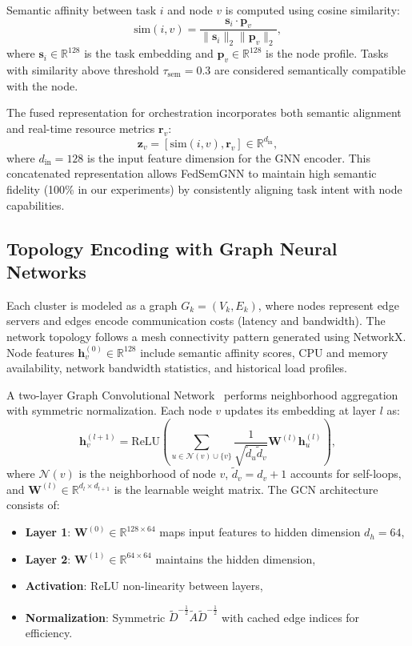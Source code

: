 Semantic affinity between task $i$ and node $v$ is computed using cosine similarity:
\begin{equation}
	\text{sim}(i,v) = \frac{\mathbf{s}_i \cdot \mathbf{p}_v}{\|\mathbf{s}_i\|_2 \|\mathbf{p}_v\|_2},
\end{equation}
where $\mathbf{s}_i \in \mathbb{R}^{128}$ is the task embedding and $\mathbf{p}_v \in \mathbb{R}^{128}$ is the node profile. Tasks with similarity above threshold $\tau_{\text{sem}} = 0.3$ are considered semantically compatible with the node.

The fused representation for orchestration incorporates both semantic alignment and real-time resource metrics $\mathbf{r}_v$:
\begin{equation}
	\mathbf{z}_v = [\text{sim}(i,v), \mathbf{r}_v] \in \mathbb{R}^{d_{\text{in}}},
\end{equation}
where $d_{\text{in}} = 128$ is the input feature dimension for the GNN encoder. This concatenated representation allows FedSemGNN to maintain high semantic fidelity (100\% in our experiments) by consistently aligning task intent with node capabilities.

\subsection{Topology Encoding with Graph Neural Networks}
\label{subsec:topology_encoding}

Each cluster is modeled as a graph $G_k = (V_k, E_k)$, where nodes represent edge servers and edges encode communication costs (latency and bandwidth). The network topology follows a mesh connectivity pattern generated using NetworkX. Node features $\mathbf{h}_v^{(0)} \in \mathbb{R}^{128}$ include semantic affinity scores, CPU and memory availability, network bandwidth statistics, and historical load profiles.

A two-layer Graph Convolutional Network~\cite{Kipf2017_GCN} performs neighborhood aggregation with symmetric normalization. Each node $v$ updates its embedding at layer $l$ as:
\begin{equation}
	\mathbf{h}_v^{(l+1)} = \text{ReLU} \left( \sum_{u \in \mathcal{N}(v) \cup \{v\}} \frac{1}{\sqrt{\tilde{d}_u \tilde{d}_v}} \mathbf{W}^{(l)} \mathbf{h}_u^{(l)} \right),
\end{equation}
where $\mathcal{N}(v)$ is the neighborhood of node $v$, $\tilde{d}_v = d_v + 1$ accounts for self-loops, and $\mathbf{W}^{(l)} \in \mathbb{R}^{d_l \times d_{l+1}}$ is the learnable weight matrix. The GCN architecture consists of:
\begin{itemize}
	\item \textbf{Layer 1}: $\mathbf{W}^{(0)} \in \mathbb{R}^{128 \times 64}$ maps input features to hidden dimension $d_h = 64$,
	\item \textbf{Layer 2}: $\mathbf{W}^{(1)} \in \mathbb{R}^{64 \times 64}$ maintains the hidden dimension,
	\item \textbf{Activation}: ReLU non-linearity between layers,
	\item \textbf{Normalization}: Symmetric $\tilde{D}^{-\frac{1}{2}} \tilde{A} \tilde{D}^{-\frac{1}{2}}$ with cached edge indices for efficiency.
\end{itemize}

